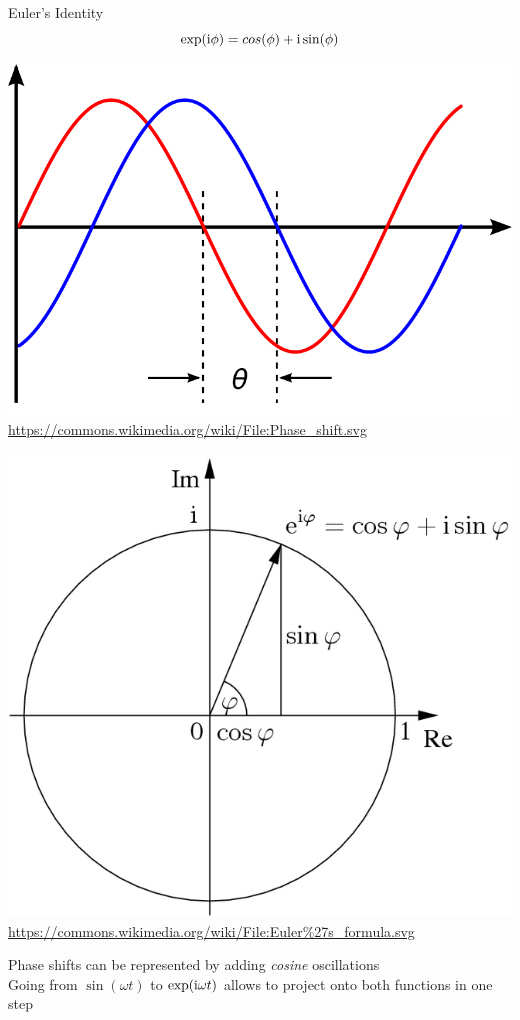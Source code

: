 
\begin{frame}[fragile]{Euler's Identity}
%
\[ \exp(\mathrm{i} \phi) = cos(\phi) + \mathrm{i} \sin(\phi) \]
%
\begin{minipage}{.49\linewidth}

\begin{center}
	\tiny
	\includegraphics[width=.65\linewidth]{./gfx/phaseshift}
	\url{https://commons.wikimedia.org/wiki/File:Phase_shift.svg}
\end{center}
\end{minipage}
%
\begin{minipage}{.49\linewidth}

\begin{center}
	\tiny
	\includegraphics[width=.65\linewidth]{./gfx/EulerIdentity}
	\url{https://commons.wikimedia.org/wiki/File:Euler%27s_formula.svg}
\end{center}
\end{minipage}
%
Phase shifts can be represented by adding \emph{cosine} oscillations\\
Going from $\sin(\omega t)$ to $\exp(\mathrm{i} \omega t)$ allows to project onto both functions in one step
%
\end{frame}

